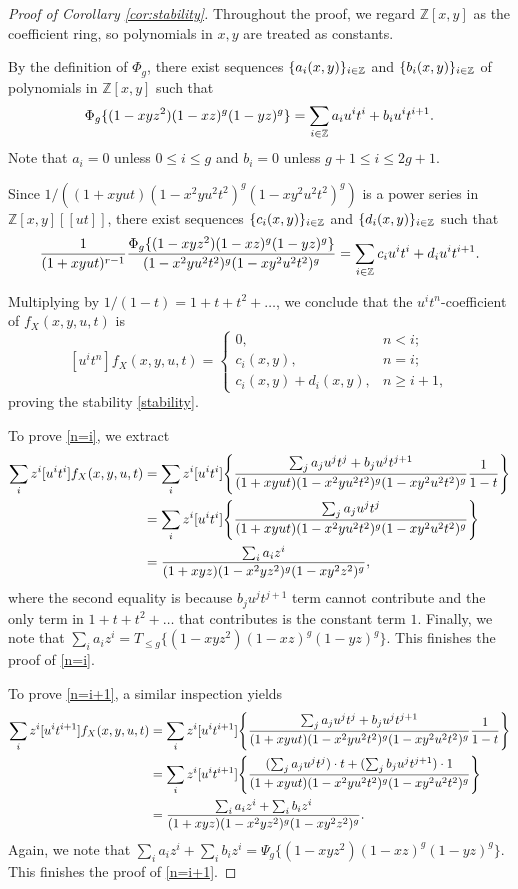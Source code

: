 \documentclass[11pt,reqno]{amsproc}
\numberwithin{equation}{section}
\theoremstyle{definition}
\theoremstyle{remark}
\newcommand\Z{{\mathbb Z}}
\DeclarePairedDelimiter{\set}{\{}{\}}
\begin{document}
\begin{proof}[Proof of Corollary \ref{cor:stability}]
    Throughout the proof, we regard $\Z[x,y]$ as the coefficient ring, so polynomials in $x,y$ are treated as constants.
    
    By the definition of $\Phi_g$, there exist sequences $\set{a_i(x,y)}_{i\in \Z}$ and $\set{b_i(x,y)}_{i\in \Z}$  of polynomials in $\Z[x,y]$ such that
    \[ \Phi_g\set{(1-xyz^2)(1-xz)^g(1-yz)^g} = \sum_{i\in \Z} a_i u^i t^i + b_i u^i t^{i+1}.\]
    Note that $a_i=0$ unless $0\leq i\leq g$ and $b_i=0$ unless $g+1\leq i\leq 2g+1$.

    Since $1/((1+xyut)(1-x^2y u^2 t^2)^g(1-xy^2 u^2 t^2)^g)$ is a power series in $\Z[x,y][[ut]]$, there exist sequences $\set{c_i(x,y)}_{i\in \Z}$ and $\set{d_i(x,y)}_{i\in \Z}$ such that
    \[ \frac{1}{(1+xyut)^{r-1}} \frac{\Phi_g\set{(1-xyz^2)(1-xz)^g(1-yz)^g}}{(1-x^2 yu^2t^2)^g(1-xy^2u^2t^2)^g} = \sum_{i\in \Z} c_i u^i t^i + d_i u^i t^{i+1}.\]

    Multiplying by $1/(1-t)=1+t+t^2+\dots$, we conclude that the $u^i t^n$-coefficient of $f_X(x,y,u,t)$ is
    \[ [u^i t^n]f_X(x,y,u,t)=\begin{cases}
        0,&n<i;\\
        c_i(x,y),&n=i;\\
        c_i(x,y)+d_i(x,y),&n\geq i+1,
    \end{cases}\]
    proving the stability \ref{stability}.

    To prove \ref{n=i}, we extract
    \begin{align*}
        \sum_i z^i [u^i t^i]f_X(x,y,u,t) &= \sum_i z^i [u^i t^i]\set*{\frac{\sum_j a_j u^j t^j+b_j u^j t^{j+1}}{(1+xyut)(1-x^2y u^2 t^2)^g(1-xy^2 u^2 t^2)^g}\frac{1}{1-t}}\\
        &=\sum_i z^i [u^i t^i]\set*{\frac{\sum_j a_j u^j t^j}{(1+xyut)(1-x^2y u^2 t^2)^g(1-xy^2 u^2 t^2)^g}}\\
        &=\frac{\sum_i a_i z^i}{(1+xyz)(1-x^2y z^2)^g(1-xy^2 z^2)^g},
    \end{align*}
    where the second equality is because $b_j u^j t^{j+1}$ term cannot contribute and the only term in $1+t+t^2+\dots$ that contributes is the constant term $1$. Finally, we note that $\sum_i a_i z^i=T_{\leq g}\{(1 - xyz^2)(1 - xz)^g(1 - yz)^g\}$. This finishes the proof of \ref{n=i}.

    To prove \ref{n=i+1}, a similar inspection yields
    \begin{align*}
        \sum_i z^i [u^i t^{i+1}]f_X(x,y,u,t) &= \sum_i z^i [u^i t^{i+1}]\set*{\frac{\sum_j a_j u^j t^j+b_j u^j t^{j+1}}{(1+xyut)(1-x^2y u^2 t^2)^g(1-xy^2 u^2 t^2)^g}\frac{1}{1-t}}\\
        &=\sum_i z^i [u^i t^{i+1}]\set*{\frac{(\sum_j a_j u^j t^j)\cdot t+(\sum_j b_j u^j t^{j+1})\cdot 1}{(1+xyut)(1-x^2y u^2 t^2)^g(1-xy^2 u^2 t^2)^g}}\\
        &=\frac{\sum_i a_i z^i+\sum_i b_i z^i}{(1+xyz)(1-x^2y z^2)^g(1-xy^2 z^2)^g}.
    \end{align*}
    Again, we note that $\sum_i a_i z^i+\sum_i b_i z^i=\Psi_g\{(1 - xyz^2)(1 - xz)^g(1 - yz)^g\}$. This finishes the proof of \ref{n=i+1}.
\end{proof}





%
\end{document}
